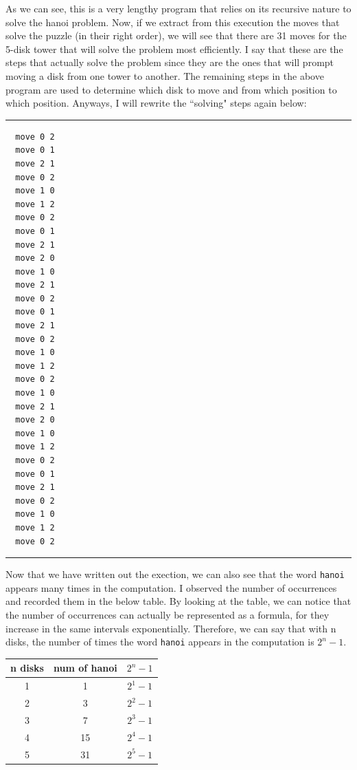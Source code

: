 \documentclass{article}
\theoremstyle{theorem}
\theoremstyle{definition}
\theoremstyle{remark}
\begin{document}
As we can see, this is a very lengthy program that relies on its recursive nature to solve the hanoi problem. Now, if we extract from this execution the moves that solve the puzzle (in their right order), we will see that there are 31 moves for the 5-disk tower 
that will solve the problem most efficiently. I say that these are the steps that actually solve the problem since they are the ones that will prompt moving a disk from one tower to another. The remaining steps in the above program are used to determine which disk to move 
and from which position to which position. Anyways, I will rewrite the ``solving" steps again below: \\

\noindent
  {\color{gray} \rule{\linewidth}{0.05mm}}
\begin{verbatim}
  move 0 2
  move 0 1
  move 2 1
  move 0 2
  move 1 0
  move 1 2
  move 0 2
  move 0 1 
  move 2 1
  move 2 0
  move 1 0
  move 2 1
  move 0 2
  move 0 1
  move 2 1
  move 0 2
  move 1 0
  move 1 2
  move 0 2
  move 1 0
  move 2 1
  move 2 0
  move 1 0
  move 1 2
  move 0 2
  move 0 1
  move 2 1
  move 0 2
  move 1 0
  move 1 2
  move 0 2
\end{verbatim}
\noindent
  {\color{gray} \rule{\linewidth}{0.05mm}}

Now that we have written out the exection, we can also see that the word \texttt{hanoi} appears many times in the computation. I observed the number of occurrences and recorded them in the below table. By looking at the table, we can notice that the
number of occurrences can actually be represented as a formula, for they increase in the same intervals exponentially. Therefore, we can say that with n disks, the number of times the word \texttt{hanoi} appears in the computation is \(2^n - 1\). 
\begin{center}
  \begin{tabular}{|c c c|}
    \hline
    n disks & num of hanoi  & \(2^n - 1\)\\
    \hline 
    1 & 1 & \(2^1 - 1\)\\
    \hline 
    2 & 3 & \(2^2 - 1\)\\
    \hline 
    3 & 7 & \(2^3 - 1\)\\
    \hline 
    4 & 15 & \(2^4 - 1\)\\
    \hline 
    5 & 31 & \(2^5 - 1\)\\
    \hline
  \end{tabular}
\end{center}
\end{document}

